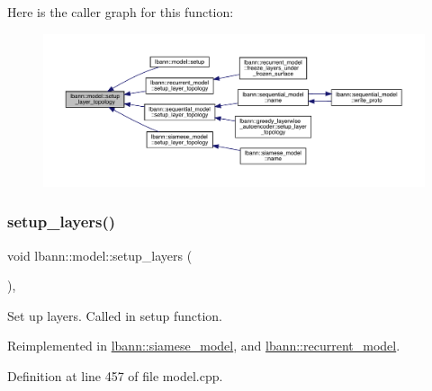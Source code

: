 Here is the caller graph for this function\+:\nopagebreak
\begin{figure}[H]
\begin{center}
\leavevmode
\includegraphics[width=350pt]{classlbann_1_1model_a7b3e2a643c658dcaa7478d2568f29784_icgraph}
\end{center}
\end{figure}
\mbox{\label{classlbann_1_1model_a989ab581e359f65c9238d627cce5b589}} 
\subsubsection{\texorpdfstring{setup\+\_\+layers()}{setup\_layers()}}
{\footnotesize\ttfamily void lbann\+::model\+::setup\+\_\+layers (\begin{DoxyParamCaption}{ }\end{DoxyParamCaption})\hspace{0.3cm}{\ttfamily [protected]}, {\ttfamily [virtual]}}

Set up layers. Called in setup function. 

Reimplemented in \hyperlink{classlbann_1_1siamese__model_afefdbaf473d40e571b2b58539001c9c0}{lbann\+::siamese\+\_\+model}, and \hyperlink{classlbann_1_1recurrent__model_a712dabb1c1e90f6e268b42f6abaedd93}{lbann\+::recurrent\+\_\+model}.



Definition at line 457 of file model.\+cpp.


